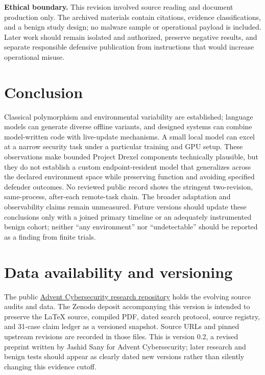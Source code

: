 \documentclass[11pt,letterpaper]{article}
\begin{document}
\textbf{Ethical boundary.} This revision involved source reading and document production only. The archived materials contain citations, evidence classifications, and a benign study design; no malware sample or operational payload is included. Later work should remain isolated and authorized, preserve negative results, and separate responsible defensive publication from instructions that would increase operational misuse.

\section{Conclusion}\label{sec:conclusion}

Classical polymorphism and environmental variability are established; language models can generate diverse offline variants, and designed systems can combine model-written code with live-update mechanisms. A small local model can excel at a narrow security task under a particular training and GPU setup. These observations make bounded Project Drexel components technically plausible, but they do not establish a custom endpoint-resident model that generalizes across the declared environment space while preserving function and avoiding specified defender outcomes. No reviewed public record shows the stringent two-revision, same-process, after-each remote-task chain. The broader adaptation and observability claims remain unmeasured. Future versions should update these conclusions only with a joined primary timeline or an adequately instrumented benign cohort; neither ``any environment'' nor ``undetectable'' should be reported as a finding from finite trials.

\section*{Data availability and versioning}

The public \href{https://github.com/Advent-Cybersecurity/advent-drexel}{Advent Cybersecurity research repository} holds the evolving source audits and data. The Zenodo deposit accompanying this version is intended to preserve the LaTeX source, compiled PDF, dated search protocol, source registry, and 31-case claim ledger as a versioned snapshot. Source URLs and pinned upstream revisions are recorded in those files. This is version 0.2, a revised preprint written by Jashid Sany for Advent Cybersecurity; later research and benign tests should appear as clearly dated new versions rather than silently changing this evidence cutoff.
\end{document}
